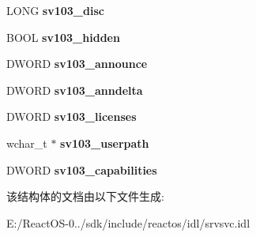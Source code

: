\begin{DoxyCompactItemize}
L\+O\+NG {\bfseries sv103\+\_\+disc}
\item 
\mbox{\label{struct___s_e_r_v_e_r___i_n_f_o__103_a0d363f0d641b0a635906167f365e7e9e}} 
B\+O\+OL {\bfseries sv103\+\_\+hidden}
\item 
\mbox{\label{struct___s_e_r_v_e_r___i_n_f_o__103_a1f0dbe7a6b349ddb2f2fb40529766c71}} 
D\+W\+O\+RD {\bfseries sv103\+\_\+announce}
\item 
\mbox{\label{struct___s_e_r_v_e_r___i_n_f_o__103_a77ad5609c2313e53f748283da361bc7b}} 
D\+W\+O\+RD {\bfseries sv103\+\_\+anndelta}
\item 
\mbox{\label{struct___s_e_r_v_e_r___i_n_f_o__103_aa67249dafa9e841bd4a46107bf529bec}} 
D\+W\+O\+RD {\bfseries sv103\+\_\+licenses}
\item 
\mbox{\label{struct___s_e_r_v_e_r___i_n_f_o__103_a4838e5124ee3c84f3784e2f1370b6723}} 
wchar\+\_\+t $\ast$ {\bfseries sv103\+\_\+userpath}
\item 
\mbox{\label{struct___s_e_r_v_e_r___i_n_f_o__103_a6d64675b5ddd85212d5b7ab1e26bb3eb}} 
D\+W\+O\+RD {\bfseries sv103\+\_\+capabilities}
\end{DoxyCompactItemize}


该结构体的文档由以下文件生成\+:\begin{DoxyCompactItemize}
\item 
E\+:/\+React\+O\+S-\/0../sdk/include/reactos/idl/srvsvc.\+idl\end{DoxyCompactItemize}

